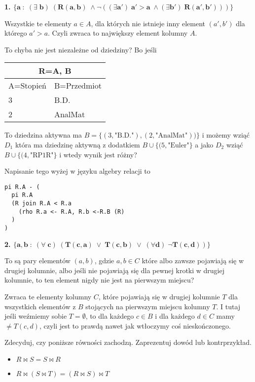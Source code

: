 \documentclass{article}
\begin{document}
\begin{solution}
  \textbf{\color{green}1. $\boldsymbol{\{a\;:\;(\exists\;b)\;(R(a, b)\;\land \neg ((\exists a')\;a'>a\;\land (\exists b')\;R(a', b')))\}}$}

  Wszystkie te elementy $a\in A$, dla których nie istnieje inny element $(a', b')$ dla którego $a'>a$. Czyli zwraca to największy element kolumny $A$.

  To chyba nie jest niezależne od dziedziny? Bo jeśli
  \begin{center}
    \begin{tabular}{ | m{} | m{} | }
      \hline 
      \multicolumn{2}{|c|}{R=A, B}\\ 
      \hline 
      A=Stopień & B=Przedmiot\\ 
      \hline 
      3 & B.D.\\ 
      \hline
      2 & AnalMat\\ 
      \hline
    \end{tabular}
  \end{center}
  To dziedzina aktywna ma $B=\{(3, \text{"B.D."}), (2, \text{"AnalMat"}))\}$ i możemy wziąć $D_1$ która ma dziedzinę aktywną z dodatkiem $B\cup \{(5, \text{"Euler"}\}$ a jako $D_2$ wziąć $B\cup \{(4, \text{"RP1R"}\}$ i wtedy wynik jest różny?

  Napisanie tego wyżej w języku algebry relacji to
  \begin{lstlisting}
pi R.A - (
  pi R.A 
  (R join R.A < R.a 
    (rho R.a <- R.A, R.b <-R.B (R)
  )
)
  \end{lstlisting}


  \textbf{\color{green}2. $\boldsymbol{\{a, b\;:\;(\forall\;c)\;(T(c, a)\;\lor\;T(c, b)\;\lor\;(\forall d)\;\neg T(c, d))\}}$}

  To są pary elementów $(a, b)$, gdzie $a,b\in C$ które albo zawsze pojawiają się w drugiej kolumnie, albo jeśli nie pojawiają się dla pewnej krotki w drugiej kolumnie, to ten element nigdy nie jest na pierwszym miejscu?

  Zwraca te elementy kolumny $C$, które pojawiają się w drugiej kolumnie $T$ dla wszystkich elementów z $B$ stojących na pierwszym miejscu kolumny $T$. I tutaj jeśli weźmiemy sobie $T=\emptyset$, to dla każdego $c\in B$ i dla każdego $d\in C$ mamy $\neq T(c, d)$, czyli jest to prawdą nawet jak wtłoczymy coś nieskończonego.
\end{solution}

\begin{problem}
  Zdecyduj, czy poniższe równości zachodzą. Zaprezentuj dowód lub kontrprzykład.
  \begin{itemize}
    \item $R\bowtie S=S\bowtie R$
    \item $R\bowtie (S\bowtie T)=(R\bowtie S)\bowtie T$
  \end{itemize}
\end{problem}
\end{document}
